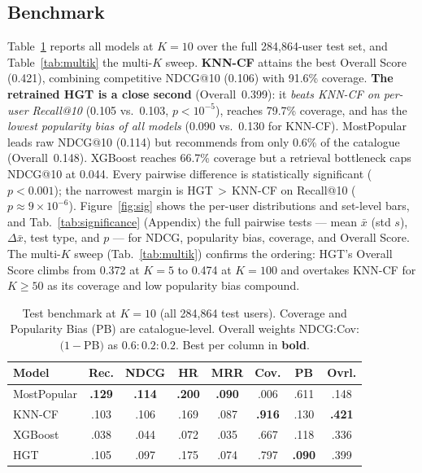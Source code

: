\documentclass[10pt,twocolumn,letterpaper]{article}
\begin{document}
\subsection{Benchmark}
Table~\ref{tab:benchmark} reports all models at $K{=}10$ over the full
284{,}864-user test set, and Table~\ref{tab:multik} the multi-$K$ sweep.
\textbf{KNN-CF} attains the best Overall Score (0.421), combining competitive
NDCG@10 (0.106) with 91.6\% coverage. \textbf{The retrained HGT is a close
second} (Overall~0.399): it \emph{beats KNN-CF on per-user Recall@10}
(0.105 vs.\ 0.103, $p<10^{-5}$), reaches 79.7\% coverage, and has the
\emph{lowest popularity bias of all models} (0.090 vs.\ 0.130 for KNN-CF).
MostPopular leads raw NDCG@10 (0.114) but recommends from only 0.6\% of the
catalogue (Overall~0.148). XGBoost reaches 66.7\% coverage but a retrieval
bottleneck caps NDCG@10 at 0.044. Every pairwise difference is statistically
significant ($p<0.001$); the narrowest margin is HGT$\,>\,$KNN-CF on Recall@10
($p\approx9\!\times\!10^{-6}$). Figure~\ref{fig:sig} shows the per-user
distributions and set-level bars, and Tab.~\ref{tab:significance} (Appendix) the
full pairwise tests --- mean $\bar{x}$ (std $s$), $\Delta\bar{x}$, test type, and
$p$ --- for NDCG, popularity bias, coverage, and Overall Score. The multi-$K$ sweep (Tab.~\ref{tab:multik})
confirms the ordering: HGT's Overall Score climbs from 0.372 at $K{=}5$ to 0.474
at $K{=}100$ and overtakes KNN-CF for $K\!\geq\!50$ as its coverage and low
popularity bias compound.

\begin{table}[t]
\centering\footnotesize
\caption{Test benchmark at $K{=}10$ (all 284{,}864 test users). Coverage and
Popularity Bias (PB) are catalogue-level. Overall weights NDCG:Cov:$(1-$PB$)$ as
$0.6{:}0.2{:}0.2$. Best per column in \textbf{bold}.}
\label{tab:benchmark}
\setlength{\tabcolsep}{3pt}
\renewcommand{\arraystretch}{1.1}
\begin{tabular}{lccccccc}
\toprule
\textbf{Model} & \textbf{Rec.} & \textbf{NDCG} & \textbf{HR} & \textbf{MRR} & \textbf{Cov.} & \textbf{PB} & \textbf{Ovrl.}\\
\midrule
MostPopular  & \textbf{.129} & \textbf{.114} & \textbf{.200} & \textbf{.090} & .006 & .611 & .148\\
KNN-CF       & .103 & .106 & .169 & .087 & \textbf{.916} & .130 & \textbf{.421}\\
XGBoost      & .038 & .044 & .072 & .035 & .667 & .118 & .336\\
HGT          & .105 & .097 & .175 & .074 & .797 & \textbf{.090} & .399\\
\bottomrule
\end{tabular}
\end{table}
\end{document}
